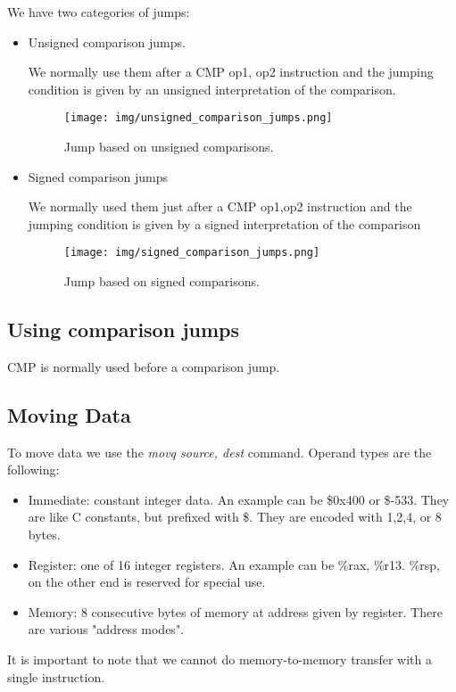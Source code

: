 We have two categories of jumps: 
\begin{itemize}
    \item Unsigned comparison jumps.
\par    
We normally use them after a CMP op1, op2 instruction and the jumping condition is given by an unsigned interpretation of the comparison. 
\begin{figure}[h!]
\centering
\texttt{[image: img/unsigned\_comparison\_jumps.png]}\caption{Jump based on unsigned comparisons.}
\label{fig:unsigned_comparision_jumps.}
\end{figure}
    \item Signed comparison jumps 
    
\par
We normally used them just after a
CMP op1,op2 instruction and the jumping condition is given by a
signed interpretation of the comparison
\begin{figure}[h!]
\centering
\texttt{[image: img/signed\_comparison\_jumps.png]}\caption{Jump based on signed comparisons.}
\label{fig:signed_comparision_jumps.}
\end{figure}
\end{itemize}

\subsection{Using comparison jumps}

CMP is normally used before a comparison jump. 

\subsection{Moving Data}

To move data we use the \textit{movq source, dest} command.
Operand types are the following: 
\begin{itemize}
    \item Immediate: constant integer data. An example can be \$0x400 or \$-533. They are like C constants, but prefixed with \$. They are encoded with 1,2,4, or 8 bytes.  
    \item Register: one of 16 integer registers. An example can be \%rax, \%r13. \%rsp, on the other end is reserved for special use.  
    \item Memory: 8 consecutive bytes of memory at address given by register. There are various "address modes". 
\end{itemize}

It is important to note that we cannot do memory-to-memory transfer with a single instruction. 
